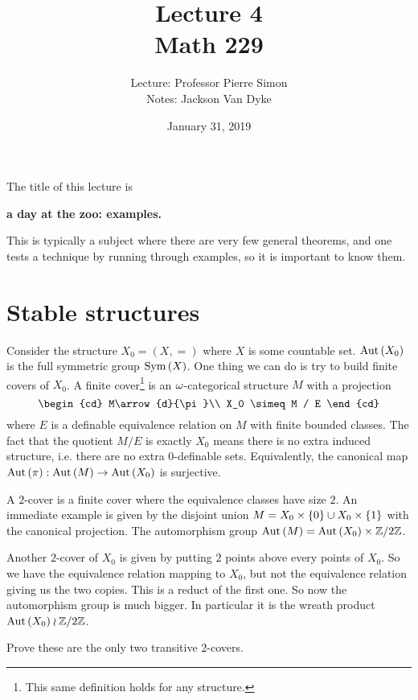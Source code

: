 \documentclass{amsart}
\begin{document}
\title{Lecture 4\\Math 229}
\date{January 31, 2019}
\author{Lecture: Professor Pierre Simon\\Notes: Jackson Van Dyke}
\maketitle

The title of this lecture is 
\begin{center}
\textbf{a day at the zoo: examples.}
\end{center}

This is typically a subject where there are
very few general theorems, and 
one tests a technique by running through examples, 
so it is important to know them.

\section{Stable structures}

Consider the structure
$X_0 = \left( X , = \right)$ where $X$ is some countable set.
$\operatorname{Aut}\left( X_0 \right)$ is the full symmetric group
$\operatorname{Sym}\left( X \right)$.
One thing we can do is try to build finite covers of $X_0$. 
A finite cover\footnote{This same definition holds for any structure.}
is an $\omega$-categorical structure $M$ with a projection
\begin{equation}
\begin{cd}
M\arrow{d}{\pi}\\ X_0 \simeq M / E
\end{cd}
\end{equation}
where $E$ is a definable equivalence relation on $M$ with finite bounded classes.
The fact that the quotient $M / E$ is exactly $X_0$ means 
there is no extra induced structure, i.e.
there are no extra $0$-definable sets.
Equivalently, the canonical map
$\operatorname{Aut}\left( \pi \right) : \operatorname{Aut}\left( M \right) \rightarrow \operatorname{Aut}\left( X_0 \right)$
is surjective.

\begin{exm}
A $2$-cover is a finite cover where the equivalence classes have size $2$.
An immediate example is given by the disjoint union $M = X_0 \times\left\{ 0
\right\}\cup X_0 \times \left\{ 1 \right\}$ with the canonical projection.
The automorphism group $\operatorname{Aut}\left( M \right) = \operatorname{Aut}\left( X_0 \right) \times \mathbb{Z} / 2\mathbb{Z}$.
\end{exm}

\begin{exm}
Another $2$-cover of $X_0$ is given by putting $2$ points above every points of $X_0$.
So we have the equivalence relation mapping to $X_0$, but not the equivalence relation
giving us the two copies.
This is a reduct of the first one. So now the automorphism group is much bigger.
In particular it is the wreath product $\operatorname{Aut}\left( X_0 \right) \wr \mathbb{Z}/ 2\mathbb{Z}$.
\begin{exr}[*]
Prove these are the only two transitive $2$-covers.
\end{exr}
\end{exm}
\end{document}
